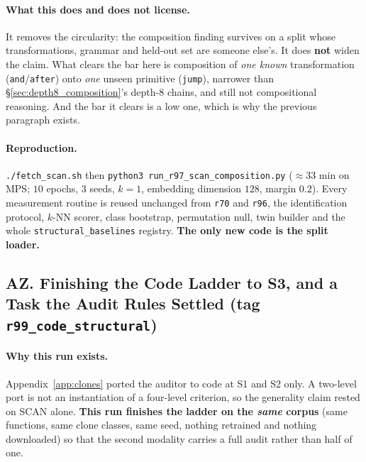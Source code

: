 \paragraph{What this does and does not license.} It removes the circularity: the composition finding survives on a split whose transformations, grammar and held-out set are someone else's. It does \textbf{not} widen the claim. What clears the bar here is composition of \emph{one known} transformation (\texttt{and}/\texttt{after}) onto \emph{one} unseen primitive (\texttt{jump}), narrower than \S\ref{sec:depth8_composition}'s depth-8 chains, and still not compositional reasoning. And the bar it clears is a low one, which is why the previous paragraph exists.

\paragraph{Reproduction.} \texttt{./fetch\_scan.sh} then \texttt{python3 run\_r97\_scan\_composition.py} ($\approx33$ min on MPS; $10$ epochs, $3$ seeds, $k{=}1$, embedding dimension $128$, margin $0.2$). Every measurement routine is reused unchanged from \texttt{r70} and \texttt{r96}, the identification protocol, $k$-NN scorer, class bootstrap, permutation null, twin builder and the whole \texttt{structural\_baselines} registry. \textbf{The only new code is the split loader.}

\subsection*{AZ. Finishing the Code Ladder to S3, and a Task the Audit Rules Settled (tag \texttt{r99\_code\_structural})}

\paragraph{Why this run exists.} Appendix~\ref{app:clones} ported the auditor to code at S1 and S2 only. A two-level port is not an instantiation of a four-level criterion, so the generality claim rested on SCAN alone. \textbf{This run finishes the ladder on the \emph{same} corpus} (same functions, same clone classes, same seed, nothing retrained and nothing downloaded) so that the second modality carries a full audit rather than half of one.

